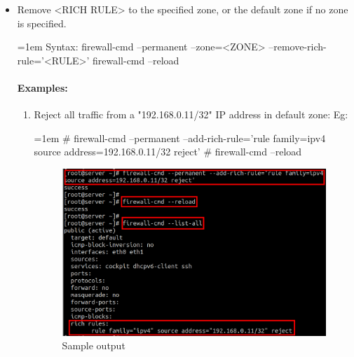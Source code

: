 \begin{flushleft}
\begin{itemize}
	\bigskip
	\bigskip
	\item Remove <RICH RULE> to the specified zone, or the default zone if no zone is specified.
	\bigskip
	\begin{tcolorbox}[breakable,notitle,boxrule=0pt,colback=pink,colframe=pink]
		\color{black}
		\font=1em
		Syntax: 
		\newline
		firewall-cmd --permanent --zone=<ZONE> --remove-rich-rule='<RULE>'
		\newline
		firewall-cmd --reload
		\font=4pt
	\end{tcolorbox}
	
	\newpage
	
	\paragraph{Examples:}
	\bigskip
	\begin{enumerate}
		\item Reject all traffic from a "192.168.0.11/32" IP address in default zone:
		\newline
		Eg:
		\begin{tcolorbox}[breakable,notitle,boxrule=-0pt,colback=black,colframe=black]
			\color{green}
			\font=1em
			\# firewall-cmd --permanent --add-rich-rule='rule family=ipv4 source address=192.168.0.11/32 reject'
			\newline
			\newline
			\# firewall-cmd --reload
			\font=4pt
		\end{tcolorbox}
		
		\begin{figure}[h!]
			\centering
			\includegraphics[scale=.3]{content/chapter2/images/zones10.png}
			\caption{Sample output}
			\label{fig:command_prompt7}
		\end{figure}
		

\end{enumerate}
\end{itemize}
\end{flushleft}

